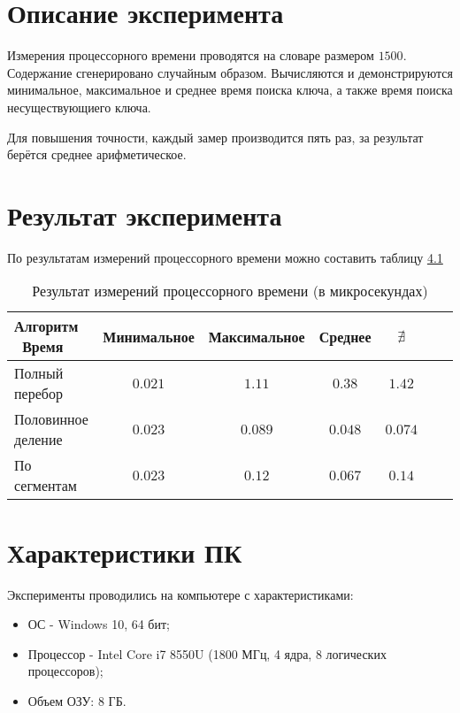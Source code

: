 \section{Описание эксперимента}
Измерения процессорного времени проводятся на словаре размером $1500$. Содержание сгенерировано случайным образом. Вычисляются и демонстрируются минимальное, максимальное и среднее время поиска ключа, а также время поиска несуществующиего ключа.

Для повышения точности, каждый замер производится пять раз, за результат берётся среднее арифметическое.

\section{Результат эксперимента}
По результатам измерений процессорного времени можно составить таблицу
\hyperref[table_4_1]{4.1}


\begin{table}[h] \label{table_4_1}
	\caption{Результат измерений процессорного времени (в микросекундах)}
	\begin{tabular}{| p{5.0cm} | c | c | c | c | c | c |}
		\hline
		Алгоритм \ Время	&Минимальное	&Максимальное	&Среднее	&$\nexists$	\\
		\hline\hline
		Полный перебор		&$0.021$		&$1.11$			&$0.38$		&$1.42$\\
		\hline
		Половинное деление	&$0.023$		&$0.089$		&$0.048$	&$0.074$\\
		\hline
		По сегментам		&$0.023$		&$0.12$			&$0.067$	&$0.14$\\
		\hline
	\end{tabular}
\end{table}

\section{Характеристики ПК}
Эксперименты проводились на компьютере с характеристиками:
\begin{itemize}
	\item ОС - Windows 10, 64 бит;
	\item Процессор -  Intel Core i7 8550U (1800 МГц, 4 ядра, 8 логических процессоров);
	\item Объем ОЗУ: 8 ГБ.
\end{itemize}

